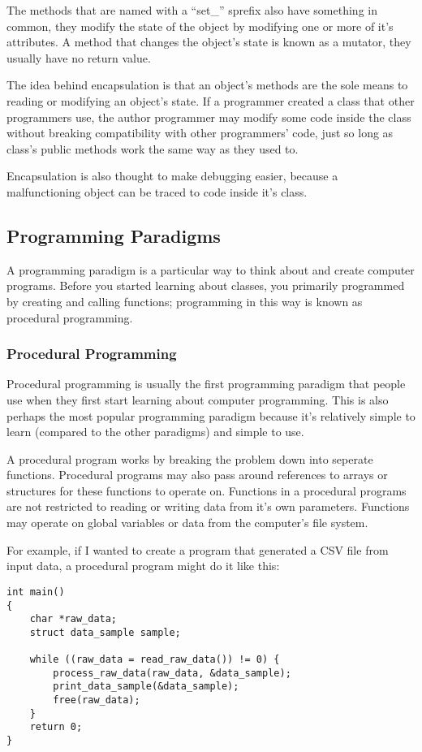 \documentclass[a4paper,12pt]{article}
\begin{document}
The methods that are named with a ``set\_'' sprefix also have something in common, they modify the state of the object by modifying one or more of it's attributes. A method that changes the object's state is known as a mutator, they usually have no return value. 

The idea behind encapsulation is that an object's methods are the sole means to reading or modifying an object's state. If a programmer created a class that other programmers use, the author programmer may modify some code inside the class without breaking compatibility with other programmers' code, just so long as class's public methods work the same way as they used to.

Encapsulation is also thought to make debugging easier, because a malfunctioning object can be traced to code inside it's class.

\subsection*{Programming Paradigms}

A programming paradigm is a particular way to think about and create computer programs. Before you started learning about classes, you primarily programmed by creating and calling functions; programming in this way is known as procedural programming.

\subsubsection*{Procedural Programming}

Procedural programming is usually the first programming paradigm that people use when they first start learning about computer programming. This is also perhaps the most popular programming paradigm because it's relatively simple to learn (compared to the other paradigms) and simple to use. 

A procedural program works by breaking the problem down into seperate functions. Procedural programs may also pass around references to arrays or structures for these functions to operate on. Functions in a procedural programs are not restricted to reading or writing data from it's own parameters. Functions may operate on global variables or data from the computer's file system.

For example, if I wanted to create a program that generated a CSV file from input data, a procedural program might do it like this:

\begin{lstlisting}
int main()
{
	char *raw_data;
	struct data_sample sample;

	while ((raw_data = read_raw_data()) != 0) {
		process_raw_data(raw_data, &data_sample);
		print_data_sample(&data_sample);
		free(raw_data);
	}
	return 0;
}
\end{lstlisting}
\end{document}
